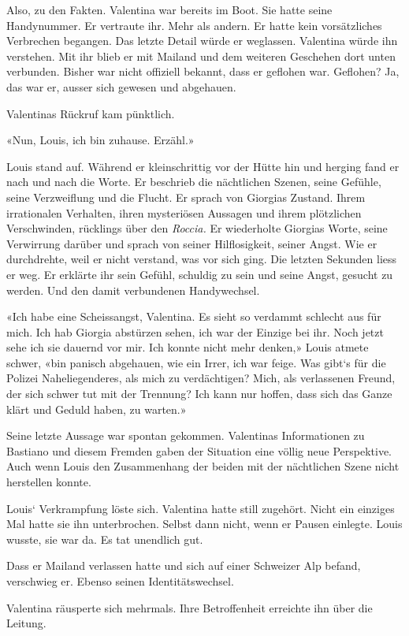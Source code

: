 Also, zu den Fakten. Valentina war bereits im Boot. Sie hatte seine
Handynummer. Er vertraute ihr. Mehr als andern. Er hatte kein
vorsätzliches Verbrechen begangen. Das letzte Detail würde er weglassen.
Valentina würde ihn verstehen. Mit ihr blieb er mit Mailand und dem
weiteren Geschehen dort unten verbunden. Bisher war nicht offiziell
bekannt, dass er geflohen war. Geflohen? Ja, das war er, ausser sich
gewesen und abgehauen.

Valentinas Rückruf kam pünktlich.

«Nun, Louis, ich bin zuhause. Erzähl.»

Louis stand auf. Während er kleinschrittig vor der Hütte hin und herging
fand er nach und nach die Worte. Er beschrieb die nächtlichen Szenen,
seine Gefühle, seine Verzweiflung und die Flucht. Er sprach von Giorgias
Zustand. Ihrem irrationalen Verhalten, ihren mysteriösen Aussagen und
ihrem plötzlichen Verschwinden, rücklings über den \emph{Roccia.} Er
wiederholte Giorgias Worte, seine Verwirrung darüber und sprach von
seiner Hilflosigkeit, seiner Angst. Wie er durchdrehte, weil er nicht
verstand, was vor sich ging. Die letzten Sekunden liess er weg. Er
erklärte ihr sein Gefühl, schuldig zu sein und seine Angst, gesucht zu
werden. Und den damit verbundenen Handywechsel.

«Ich habe eine Scheissangst, Valentina. Es sieht so verdammt schlecht
aus für mich. Ich hab Giorgia abstürzen sehen, ich war der Einzige bei
ihr. Noch jetzt sehe ich sie dauernd vor mir. Ich konnte nicht mehr
denken,» Louis atmete schwer, «bin panisch abgehauen, wie ein Irrer, ich
war feige. Was gibt`s für die Polizei Naheliegenderes, als mich zu
verdächtigen? Mich, als verlassenen Freund, der sich schwer tut mit der
Trennung? Ich kann nur hoffen, dass sich das Ganze klärt und Geduld
haben, zu warten.»

Seine letzte Aussage war spontan gekommen. Valentinas Informationen zu
Bastiano und diesem Fremden gaben der Situation eine völlig neue
Perspektive. Auch wenn Louis den Zusammenhang der beiden mit der
nächtlichen Szene nicht herstellen konnte.

Louis` Verkrampfung löste sich. Valentina hatte still zugehört. Nicht
ein einziges Mal hatte sie ihn unterbrochen. Selbst dann nicht, wenn er
Pausen einlegte. Louis wusste, sie war da. Es tat unendlich gut.

Dass er Mailand verlassen hatte und sich auf einer Schweizer Alp befand,
verschwieg er. Ebenso seinen Identitätswechsel.

Valentina räusperte sich mehrmals. Ihre Betroffenheit erreichte ihn über
die Leitung.

